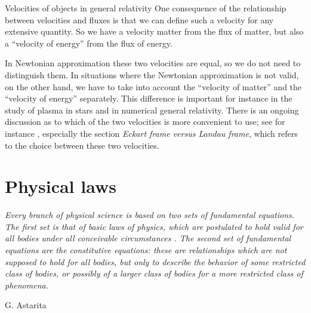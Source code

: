 \documentclass[a4paper,12pt,%
onecolumn,oneside,titlepage,%
british%
]{memoir}
\newcommand*{\incr}{\Delta}%
\renewcommand*{\|}[1][]{\nonscript\:#1\vert\nonscript\:\mathopen{}}
\begin{document}
\begin{extra}{Velocities of objects in general relativity}
  One consequence of the relationship between velocities and fluxes is that we can define such a velocity for any extensive quantity. So we have a velocity matter from the flux of matter, but also a \enquote{velocity of energy} from the flux of energy.

  In Newtonian approximation these two velocities are equal, so we do not need to distinguish them. In situations where the Newtonian approximation is not valid, on the other hand, we have to take into account the \enquote{velocity of matter} and the \enquote{velocity of energy} separately. This difference is important for instance in the study of plasma in stars and in numerical general relativity. There is an ongoing discussion as to which of the two velocities is more convenient to use; see for instance \cites{kandusetal2008}, especially the section \emph{Eckart frame versus Landau frame}, which refers to the choice between these two velocities.
\end{extra}

\clearpage


\printpagenotes*
\clearpage
\chapter{Physical laws}
\label{cha:laws}


\epigraph{\emph{%
Every branch of physical science is based on two sets of fundamental equations. The first set is that of basic laws of physics, which are postulated to hold valid for all bodies under all conceivable circumstances \textelp{}. The second set of fundamental equations are the constitutive equations: these are relationships which are not supposed to hold for all bodies, but only to describe the behavior of some restricted class of bodies, or possibly of a larger class of bodies for a more restricted class of phenomena.
}}{G. Astarita \cites*{astarita1989_r1990}}
\end{document}
